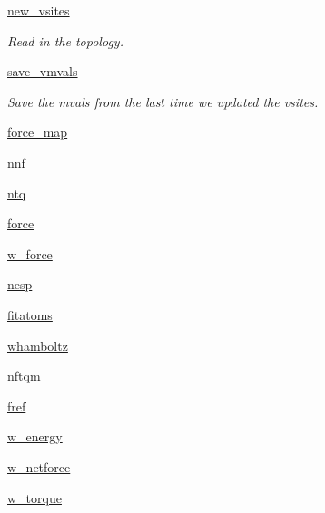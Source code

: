 \begin{DoxyCompactItemize}
\hyperlink{classforcebalance_1_1abinitio_1_1AbInitio_a64f1aeadac4d7b09424c20b83e5ad5af}{new\-\_\-vsites}
\begin{DoxyCompactList}\small\item\em Read in the topology. \end{DoxyCompactList}\item 
\hyperlink{classforcebalance_1_1abinitio_1_1AbInitio_a22037bf43728fa45f387390005e0b131}{save\-\_\-vmvals}
\begin{DoxyCompactList}\small\item\em Save the mvals from the last time we updated the vsites. \end{DoxyCompactList}\item 
\hyperlink{classforcebalance_1_1abinitio_1_1AbInitio_a6558ea4f56053b0f539f987481c57a75}{force\-\_\-map}
\item 
\hyperlink{classforcebalance_1_1abinitio_1_1AbInitio_ac4a5765bf5b089176518f47004fcdb39}{nnf}
\item 
\hyperlink{classforcebalance_1_1abinitio_1_1AbInitio_af8a895f61ddea6b9ca2765ddbf309a75}{ntq}
\item 
\hyperlink{classforcebalance_1_1abinitio_1_1AbInitio_ab483592ce22356d09b52eb594f2f4b8e}{force}
\item 
\hyperlink{classforcebalance_1_1abinitio_1_1AbInitio_a4ec4863edbb6ea4a28777de905d621d3}{w\-\_\-force}
\item 
\hyperlink{classforcebalance_1_1abinitio_1_1AbInitio_ac258ad6180275ba2ffe5f68d1217e4ac}{nesp}
\item 
\hyperlink{classforcebalance_1_1abinitio_1_1AbInitio_a8b12ea0418108cc6c7693d75cc00227f}{fitatoms}
\item 
\hyperlink{classforcebalance_1_1abinitio_1_1AbInitio_a8f70f017ca8ec54c1acdbc85eff06ab9}{whamboltz}
\item 
\hyperlink{classforcebalance_1_1abinitio_1_1AbInitio_a64ae24d7e979723e65358e227b132a4a}{nftqm}
\item 
\hyperlink{classforcebalance_1_1abinitio_1_1AbInitio_ac974dfef45b416947dd21876443d808a}{fref}
\item 
\hyperlink{classforcebalance_1_1abinitio_1_1AbInitio_aa7f09e2ffc1253844c9f0736caf9b9e5}{w\-\_\-energy}
\item 
\hyperlink{classforcebalance_1_1abinitio_1_1AbInitio_af7cbfd50ca6a0b408c417e8d3bdb7cf3}{w\-\_\-netforce}
\item 
\hyperlink{classforcebalance_1_1abinitio_1_1AbInitio_a67643b98cce62c06c95f085d3a3e9722}{w\-\_\-torque}
\item 

\end{DoxyCompactItemize}

